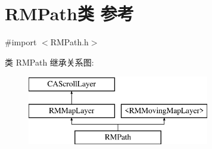 \hypertarget{interface_r_m_path}{\section{R\-M\-Path类 参考}
\label{interface_r_m_path}
}


{\ttfamily \#import $<$R\-M\-Path.\-h$>$}

类 R\-M\-Path 继承关系图\-:\begin{figure}[H]
\begin{center}
\leavevmode
\includegraphics[height=3.000000cm]{interface_r_m_path}
\end{center}
\end{figure}
